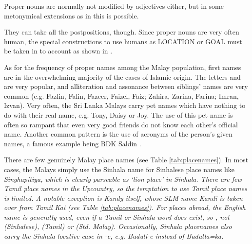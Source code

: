 Proper nouns are normally not modified by adjectives either, but in some metonymical extensions as in  this is possible.




They can take all the postpositions, though. Since proper nouns are very often human, the special constructions to use humans as LOCATION or GOAL must be taken in to account as shown in .



As for the frequency of proper names among the Malay population, first names are in the overwhelming majority of the cases of Islamic origin. The letters  and  are very popular, and alliteration and assonance between siblings' names are very common (e.g. Fazlin, Falin, Fazeer, Faizel, Faiz; Zahira, Zarina, Farina; Imran, Izvan). Very often, the Sri Lanka Malays carry pet names which have nothing to do with their real name, e.g. Tony, Daisy or Joy. The use of this pet name is often so rampant that even very good friends do not know each other's official name. Another common pattern is the use of acronyms of the person's given names, a famous example being BDK Saldin .

There are few genuinely Malay place names (see Table \ref{tab:placenames}). In most cases, the Malays simply use the Sinhala name for Sinhalese place names like \em Singhapitiya\em, which is clearly parseable as `lion place' in Sinhala. There are few Tamil place names in the Upcountry, so the temptation to use Tamil place names is limited. A notable exception is Kandy itself, whose SLM name \em Kandi \em is taken over from Tamil \em Ka\nz\dz i \em (see Table \ref{tab:placenames}). For places abroad, the English name is generally used, even if a Tamil or Sinhala word does exist, so
,
not  (Sinhalese),
  (Tamil)
 or  (Std. Malay).
Occasionally, Sinhala placenames also carry the Sinhala locative case in  \em -e, \em   e.g. \em Badull-e \em instead of \em Badulla=ka\em.

